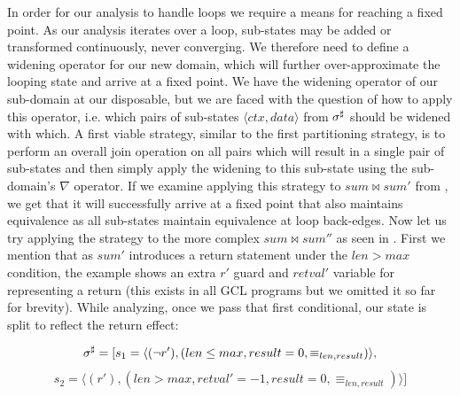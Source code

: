 In order for our analysis to handle loops we require a means for reaching a fixed point. As our analysis iterates over a loop, sub-states may be added or transformed continuously, never converging. We therefore need to define a widening operator for our new domain, which will further over-approximate the looping state and arrive at a fixed point. We have the widening operator of our sub-domain at our disposable, but we are faced with the question of how to apply this operator, i.e. which pairs of sub-states $\langle ctx , data \rangle$ from $\sigma^\sharp$ should be widened with which. A first viable strategy, similar to the first partitioning strategy, is to perform an overall join operation on all pairs which will result in a single pair of sub-states and then simply apply the widening to this sub-state using the sub-domain's $\nabla$ operator. If we examine applying this strategy to $sum \bowtie sum'$ from , we get that it will successfully arrive at a fixed point that also maintains equivalence as all sub-states maintain equivalence at loop back-edges. Now let us try applying the strategy to the more complex $sum \bowtie sum''$ as seen in . First we mention that as $sum'$ introduces a return statement under the $len > max$ condition, the example shows an extra $r'$ guard and $retval'$ variable for representing a return (this exists in all GCL programs but we omitted it so far for brevity). While analyzing, once we pass that first conditional, our state is split to reflect the return effect:

\[
\sigma^\sharp = [ s_1 = \langle (\neg r'),(len \leq max, result = 0, \equiv_{len,result}) \rangle,
\]
\[
s_2 = \langle (r'),(len > max, retval' = -1, result = 0, \equiv_{len,result}) \rangle ]
\]

